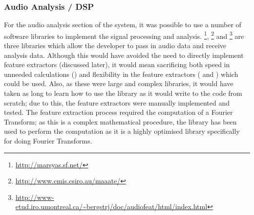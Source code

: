 \subsubsection{Audio Analysis / DSP}
For the audio analysis section of the system, it was possible to use a number of software libraries to implement the signal processing and analysis. \footnote{\url{http://marsyas.sf.net/}}, \footnote{\url{http://www.cmis.csiro.au/maaate/}} and \footnote{\url{http://www-etud.iro.umontreal.ca/~bergstrj/doc/audiofeat/html/index.html}}  are three libraries which allow the developer to pass in audio data and receive analysis data. Although this would have avoided the need to directly implement feature extractors (discussed later), it would mean sacrificing both speed in unneeded calculations () and flexibility in the feature extractors ( and ) which could be used. Also, as these were large and complex libraries, it would have taken as long to learn how to use the library as it would write to the code from scratch; due to this, the feature extractors were manually implemented and tested.
The feature extraction process required the computation of a Fourier Transform; as this is a complex mathematical procedure, the   library has been used to perform the computation as it is a highly optimised library specifically for doing Fourier Transforms.
